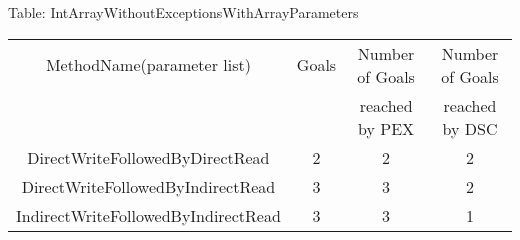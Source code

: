 \begin{table}
{Table: IntArrayWithoutExceptionsWithArrayParameters}
\begin{center}
\begin{tabular}{c|c|c|c}
\hline



MethodName(parameter list)                             &       Goals       &  Number of Goals  &  Number of Goals       \\
                                                       &                   &  reached by PEX   &  reached by DSC        \\\hline\hline



DirectWriteFollowedByDirectRead                        &           2       &           2       &           2             \\
DirectWriteFollowedByIndirectRead                      &           3       &           3       &           2             \\
IndirectWriteFollowedByIndirectRead                    &           3       &           3       &           1             \\



\hline
\end{tabular}
\end{center}
\label{table-failed}
\end{table}
